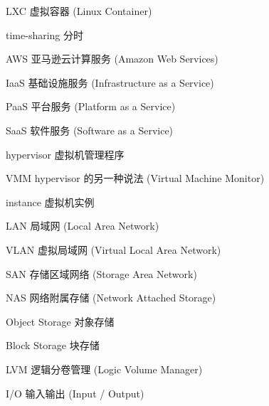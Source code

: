 \begin{denotation}[3cm]
\item[LXC] 虚拟容器 (Linux Container)
\item[time-sharing] 分时
\item[AWS] 亚马逊云计算服务 (Amazon Web Services)
\item[IaaS] 基础设施服务 (Infrastructure as a Service)
\item[PaaS] 平台服务 (Platform as a Service)
\item[SaaS] 软件服务 (Software as a Service)
\item[hypervisor] 虚拟机管理程序
\item[VMM] hypervisor 的另一种说法 (Virtual Machine Monitor)
\item[instance] 虚拟机实例
\item[LAN] 局域网 (Local Area Network)
\item[VLAN] 虚拟局域网 (Virtual Local Area Network)
\item[SAN] 存储区域网络 (Storage Area Network)
\item[NAS] 网络附属存储 (Network Attached Storage)
\item[Object Storage] 对象存储
\item[Block Storage] 块存储
\item[LVM] 逻辑分卷管理 (Logic Volume Manager)
\item[I/O] 输入输出 (Input / Output)
\end{denotation}
